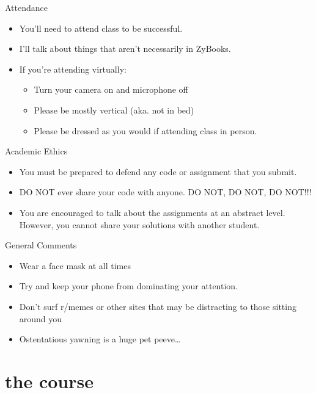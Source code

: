 \documentclass[
  11pt,
  ignorenonframetext,
]{beamer}
\providecommand{\tightlist}{%
  \setlength{\itemsep}{0pt}\setlength{\parskip}{0pt}}
\begin{document}
\begin{frame}{Attendance}
\protect\hypertarget{attendance}{}
\begin{itemize}
\item
  You'll need to attend class to be successful.
\item
  I'll talk about things that aren't necessarily in ZyBooks.
\item
  If you're attending virtually:

  \begin{itemize}
  \tightlist
  \item
    Turn your camera on and microphone off
  \item
    Please be mostly vertical (aka. not in bed)
  \item
    Please be dressed as you would if attending class in person.
  \end{itemize}
\end{itemize}
\end{frame}

\begin{frame}{Academic Ethics}
\protect\hypertarget{academic-ethics}{}
\begin{itemize}
\tightlist
\item
  You must be prepared to defend any code or assignment that you
  submit.\\
\item
  DO NOT ever share your code with anyone. DO NOT, DO NOT, DO NOT!!!
\item
  You are encouraged to talk about the assignments at an abstract level.
  However, you cannot share your solutions with another student.
\end{itemize}
\end{frame}

\begin{frame}{General Comments}
\protect\hypertarget{general-comments}{}
\begin{itemize}
\tightlist
\item
  Wear a face mask at all times
\item
  Try and keep your phone from dominating your attention.
\item
  Don't surf r/memes or other sites that may be distracting to those
  sitting around you
\item
  Ostentatious yawning is a huge pet peeve\ldots{}
\end{itemize}
\end{frame}

\hypertarget{the-course}{%
\section{the course}\label{the-course}}
\end{document}
